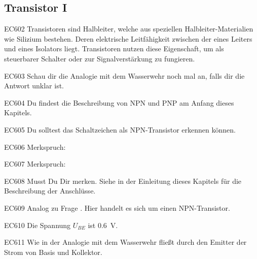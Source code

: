 \subsection{Transistor I}

\begin{sol}{EC602}
Transistoren sind Halbleiter, welche aus speziellen Halbleiter-Materialien wie Silizium bestehen. Deren elektrische Leitfähigkeit zwischen der eines Leiters und eines Isolators liegt. Transistoren nutzen diese Eigenschaft, um als steuerbarer Schalter oder zur Signalverstärkung zu fungieren.
\end{sol}

\begin{sol}{EC603}
Schau dir die Analogie mit dem Wasserwehr noch mal an, falls dir die Antwort unklar ist.
\end{sol}

\begin{sol}{EC604}
Du findest die Beschreibung von NPN und PNP am Anfang dieses Kapitels.
\end{sol}

\begin{sol}{EC605}
Du solltest das Schaltzeichen als NPN-Transistor erkennen können.
\end{sol}

\begin{sol}{EC606}
Merkspruch: 
\end{sol}

\begin{sol}{EC607}
Merkspruch: 
\end{sol}

\begin{sol}{EC608}
Musst Du Dir merken. Siehe in der Einleitung dieses Kapitels für die Beschreibung der Anschlüsse.
\end{sol}

\begin{sol}{EC609}
Analog zu Frage . Hier handelt es sich um einen NPN-Transistor. 
\end{sol}

\begin{sol}{EC610}
Die Spannung $U_{BE}$ ist \SI{0.6}{\volt}.
\end{sol}

\begin{sol}{EC611}
 Wie in der Analogie mit dem Wasserwehr fließt durch den Emitter der Strom von Basis und Kollektor.
\end{sol}

